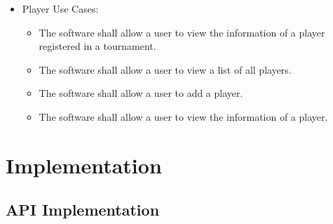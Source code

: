 \documentclass[11pt]{article}
\begin{document}
\begin{itemize}
        \item Player Use Cases:
        \begin{itemize}
            \item The software shall allow a user to view the information of a player registered in a tournament.
            \item The software shall allow a user to view a list of all players.
            \item The software shall allow a user to add a player.
            \item The software shall allow a user to view the information of a player.
        \end{itemize}

    \end{itemize}

    \section {Implementation}

    \subsection {API Implementation}
\end{document}
